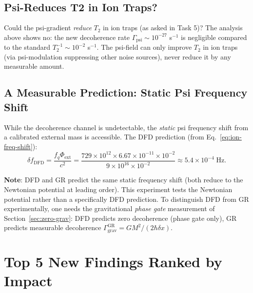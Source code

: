 \documentclass[11pt]{article}
\theoremstyle{definition}
\theoremstyle{remark}
\begin{document}
\subsection{Psi-Reduces T2 in Ion Traps?}

Could the psi-gradient \emph{reduce} $T_2$ in ion traps (as asked in Task 5)?
The analysis above shows no: the new decoherence rate $\Gamma_{\mathrm{psi}}
\sim 10^{-27}$ s$^{-1}$ is negligible compared to the standard $T_2^{-1}
\sim 10^{-2}$ s$^{-1}$.  The psi-field can only improve $T_2$ in ion traps
(via psi-modulation suppressing other noise sources), never reduce it by
any measurable amount.

\subsection{A Measurable Prediction: Static Psi Frequency Shift}

While the decoherence channel is undetectable, the \emph{static} psi frequency
shift from a calibrated external mass is accessible.  The DFD prediction
(from Eq.~\eqref{eq:ion-freq-shift}):
\begin{equation}
  \delta f_{\mathrm{DFD}} = \frac{f_q \Phi_{\mathrm{ext}}}{c^2}
  = \frac{729\times10^{12}\times6.67\times10^{-11}\times10^{-2}}
  {9\times10^{16}\times10^{-2}} \approx 5.4\times10^{-4}\;\mathrm{Hz}. \label{eq:static-shift}
\end{equation}

\textbf{Note}: DFD and GR predict the same static frequency shift (both
reduce to the Newtonian potential at leading order).  This experiment tests
the Newtonian potential rather than a specifically DFD prediction.  To
distinguish DFD from GR experimentally, one needs the gravitational
\emph{phase gate} measurement of Section~\ref{sec:zero-grav}: DFD predicts
zero decoherence (phase gate only), GR predicts measurable decoherence
$\Gamma_{\mathrm{grav}}^{\mathrm{GR}} = GM^2/(2\hbar\delta x)$.

\section{Top 5 New Findings Ranked by Impact}
\label{sec:top5}
\end{document}

